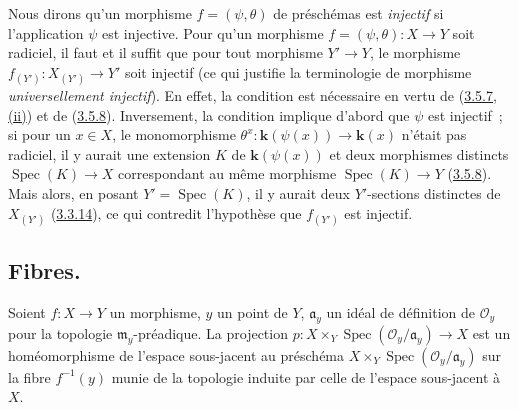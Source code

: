 \begin{remark}[3.5.11]
\label{I.3.5.11-fr}
\upshape Nous dirons qu'un morphisme $f=(\psi,\theta)$ de préschémas est
\emph{injectif} si l'application $\psi$ est injective. Pour qu'un morphisme
$f=(\psi,\theta):X\to Y$ soit radiciel, il faut et il suffit que pour tout
morphisme $Y'\to Y$, le morphisme $f_{(Y')}:X_{(Y')}\to Y'$ soit injectif (ce
qui justifie la terminologie de morphisme \emph{universellement injectif}). En
effet, la condition est nécessaire en vertu de
(\hyperref[I.3.5.7-fr]{3.5.7, (ii)}) et de
(\hyperref[I.3.5.8-fr]{3.5.8}). Inversement, la condition implique d'abord que
$\psi$ est injectif~; si pour un $x\in X$, le monomorphisme
$\theta^x:\boldsymbol{k}(\psi(x))\to\boldsymbol{k}(x)$ n'était pas radiciel, il y aurait une extension
$K$ de $\boldsymbol{k}(\psi(x))$ et deux morphismes distincts
$\operatorname{Spec}(K)\to X$ correspondant au même morphisme
$\operatorname{Spec}(K)\to Y$ (\hyperref[I.3.5.8-fr]{3.5.8}). Mais alors, en
posant $Y'=\operatorname{Spec}(K)$, il y aurait deux $Y'$-sections distinctes
de $X_{(Y')}$ (\hyperref[I.3.3.14-fr]{3.3.14}), ce qui contredit l'hypothèse
que $f_{(Y')}$ est injectif.
\end{remark}

\subsection{Fibres.}
\label{subsection:I.3.6-fr}

\begin{proposition}[3.6.1]
\label{I.3.6.1-fr}
Soient $f:X\to Y$ un morphisme, $y$ un point de $Y$, $\mathfrak{a}_y$ un
idéal de définition de $\mathcal{O}_y$ pour la topologie
$\mathfrak{m}_y$-préadique. La projection
$p:X\times_Y\operatorname{Spec}(\mathcal{O}_y/\mathfrak{a}_y)\to X$ est un
homéomorphisme de l'espace sous-jacent au préschéma
$X\times_Y\operatorname{Spec}(\mathcal{O}_y/\mathfrak{a}_y)$ sur la fibre
$f^{-1}(y)$ munie de la topologie induite par celle de l'espace sous-jacent à
$X$.
\end{proposition}

